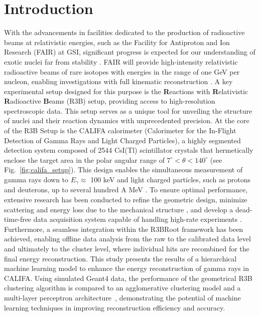 \documentclass[review,sort&compress]{elsarticle}
\begin{document}
\section{Introduction}
\label{sec:intro}
With the advancements in facilities dedicated to the production of radioactive beams at relativistic energies, such as the Facility for Antiproton and Ion Research (FAIR) at GSI, significant progress is expected for our understanding of exotic nuclei far from stability \cite{kalantar2024experiments}. FAIR will provide high-intensity relativistic radioactive beams of rare isotopes with energies in the range of one GeV per nucleon, enabling investigations with full kinematic reconstruction \cite{leifels2025status}.
A key experimental setup designed for this purpose is the \textbf{R}eactions with \textbf{R}elativistic \textbf{R}adioactive \textbf{B}eams (R3B) setup, providing access to high-resolution spectroscopic data. This setup serves as a unique tool for unveiling the structure of nuclei and their reaction dynamics with unprecedented precision.\newline
At the core of the R3B Setup is the CALIFA calorimeter (Calorimeter for the In-Flight Detection of Gamma Rays and Light Charged Particles), a highly segmented detection system composed of 2544 CsI(Tl) scintillator crystals that hermetically enclose the target area in the polar angular range of $7^\circ < \theta < 140^\circ$ (see Fig.~\ref{fig:califa_setup}). This design enables the simultaneous measurement of gamma rays down to $E_{\gamma} \approx$ 100 keV and light charged particles, such as protons and deuterons, up to several hundred A MeV \cite{cortina2014califa}. To ensure optimal performance, extensive research has been conducted to refine the geometric design, minimize scattering and energy loss due to the mechanical structure \cite{alvarez2014performance}, and develop a dead-time-free data acquisition system capable of handling high-rate experiments \cite{ledigital}. Furthermore, a seamless integration within the R3BRoot framework \cite{bertini2011r3broot} has been achieved, enabling offline data analysis from the raw to the calibrated data level and ultimately to the cluster level, where individual hits are recombined for the final energy reconstruction.\newline
This study presents the results of a hierarchical machine learning model to enhance the energy reconstruction of gamma rays in CALIFA. Using simulated Geant4 data, the performance of the geometrical R3B clustering algorithm is compared to an agglomerative clustering model \cite{Nielsen2016} and a multi-layer perceptron architecture~\cite{popescu2009multilayer}, demonstrating the potential of machine learning techniques in improving reconstruction efficiency and accuracy.\newline
\end{document}
